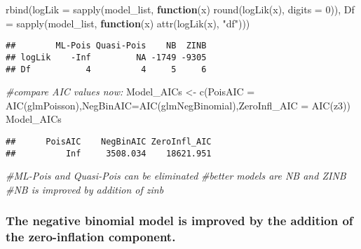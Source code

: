 \documentclass[
]{article}
\newenvironment{Shaded}{\begin{snugshade}}{\end{snugshade}}
\newcommand{\AttributeTok}[1]{\textcolor[rgb]{0.77,0.63,0.00}{#1}}
\newcommand{\CommentTok}[1]{\textcolor[rgb]{0.56,0.35,0.01}{\textit{#1}}}
\newcommand{\ControlFlowTok}[1]{\textcolor[rgb]{0.13,0.29,0.53}{\textbf{#1}}}
\newcommand{\DecValTok}[1]{\textcolor[rgb]{0.00,0.00,0.81}{#1}}
\newcommand{\FunctionTok}[1]{\textcolor[rgb]{0.00,0.00,0.00}{#1}}
\newcommand{\NormalTok}[1]{#1}
\newcommand{\OtherTok}[1]{\textcolor[rgb]{0.56,0.35,0.01}{#1}}
\newcommand{\StringTok}[1]{\textcolor[rgb]{0.31,0.60,0.02}{#1}}
\begin{document}
\begin{Shaded}
\begin{Highlighting}[]
\FunctionTok{rbind}\NormalTok{(}\AttributeTok{logLik =} \FunctionTok{sapply}\NormalTok{(model\_list, }\ControlFlowTok{function}\NormalTok{(x) }\FunctionTok{round}\NormalTok{(}\FunctionTok{logLik}\NormalTok{(x), }\AttributeTok{digits =} \DecValTok{0}\NormalTok{)),}
      \AttributeTok{Df =} \FunctionTok{sapply}\NormalTok{(model\_list, }\ControlFlowTok{function}\NormalTok{(x) }\FunctionTok{attr}\NormalTok{(}\FunctionTok{logLik}\NormalTok{(x), }\StringTok{"df"}\NormalTok{)))}
\end{Highlighting}
\end{Shaded}

\begin{verbatim}
##        ML-Pois Quasi-Pois    NB  ZINB
## logLik    -Inf         NA -1749 -9305
## Df           4          4     5     6
\end{verbatim}

\begin{Shaded}
\begin{Highlighting}[]
\CommentTok{\#compare AIC values now:}
\NormalTok{Model\_AICs }\OtherTok{\textless{}{-}} \FunctionTok{c}\NormalTok{(}\AttributeTok{PoisAIC =} \FunctionTok{AIC}\NormalTok{(glmPoisson),}\AttributeTok{NegBinAIC=}\FunctionTok{AIC}\NormalTok{(glmNegBinomial),}\AttributeTok{ZeroInfl\_AIC =} \FunctionTok{AIC}\NormalTok{(z3))}
\NormalTok{Model\_AICs}
\end{Highlighting}
\end{Shaded}

\begin{verbatim}
##      PoisAIC    NegBinAIC ZeroInfl_AIC 
##          Inf     3508.034    18621.951
\end{verbatim}

\begin{Shaded}
\begin{Highlighting}[]
\CommentTok{\#ML{-}Pois and Quasi{-}Pois can be eliminated}
\CommentTok{\#better models are NB and ZINB}
\CommentTok{\#NB is improved by addition of zinb }
\end{Highlighting}
\end{Shaded}

\hypertarget{the-negative-binomial-model-is-improved-by-the-addition-of-the-zero-inflation-component.}{%
\subsubsection{The negative binomial model is improved by the addition
of the zero-inflation
component.}\label{the-negative-binomial-model-is-improved-by-the-addition-of-the-zero-inflation-component.}}
\end{document}
